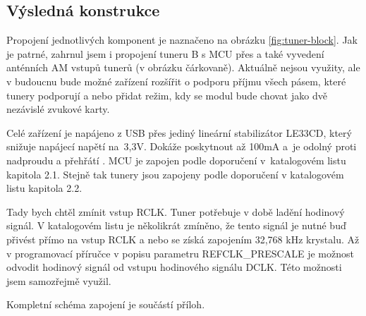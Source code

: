 \subsection{Výsledná konstrukce}
\label{subsec:konstrukce}

Propojení jednotlivých komponent je naznačeno na obrázku \ref{fig:tuner-block}. Jak je patrné, zahrnul jsem i propojení tuneru B s MCU přes \iis a také vyvedení anténních AM vstupů tunerů (v obrázku čárkovaně). Aktuálně nejsou využity, ale v budoucnu bude možné zařízení rozšířit o podporu příjmu všech pásem, které tunery podporují a nebo přidat režim, kdy se modul bude chovat jako dvě nezávislé zvukové karty.

Celé zařízení je napájeno z USB přes jediný lineární stabilizátor LE33CD, který snižuje napájecí napětí na~3,3V. Dokáže poskytnout až 100mA a~je odolný proti nadproudu a přehřátí \cite{le}. MCU je zapojen podle doporučení v~katalogovém listu \cite{pic} kapitola 2.1. Stejně tak tunery jsou zapojeny podle doporučení v katalogovém listu \cite{tuner-datasheet} kapitola 2.2.

 Tady bych chtěl zmínit vstup RCLK. Tuner potřebuje v době ladění hodinový signál. V katalogovém listu je několikrát zmíněno, že tento signál je nutné buď přivést přímo na vstup RCLK a nebo se získá zapojením 32,768 kHz krystalu. Až v programovací příručce \cite{tuner-programing} v popisu parametru REFCLK\_PRESCALE je možnost odvodit hodinový signál od vstupu hodinového signálu \iis DCLK. Této možnosti jsem samozřejmě využil.
 
Kompletní schéma zapojení je součástí příloh.

